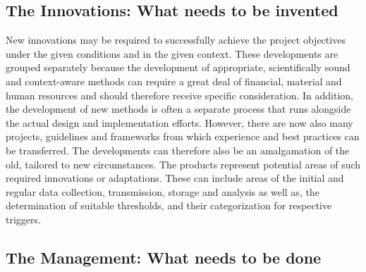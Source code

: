 
\subsection{The Innovations: What needs to be invented}%
New innovations may be required to successfully achieve the project objectives under the given conditions and in the given context. These developments are grouped separately because the development of appropriate, scientifically sound and context-aware methods can require a great deal of financial, material and human resources and should therefore receive specific consideration. In addition, the development of new methods is often a separate process that runs alongside the actual design and implementation efforts. However, there are now also many projects, guidelines and frameworks from which experience and best practices can be transferred. The developments can therefore also be an amalgamation of the old, tailored to new circumstances.\newline
The products represent potential areas of such required innovations or adaptations. These can include areas of the initial and regular data collection, transmission, storage and analysis as well as, the determination of suitable thresholds, and their categorization for respective triggers.


\subsection{The Management: What needs to be done}%

